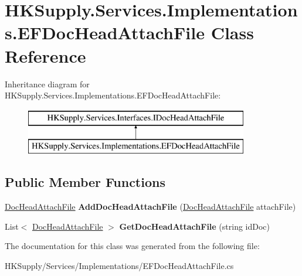 \hypertarget{class_h_k_supply_1_1_services_1_1_implementations_1_1_e_f_doc_head_attach_file}{}\section{H\+K\+Supply.\+Services.\+Implementations.\+E\+F\+Doc\+Head\+Attach\+File Class Reference}
\label{class_h_k_supply_1_1_services_1_1_implementations_1_1_e_f_doc_head_attach_file}
Inheritance diagram for H\+K\+Supply.\+Services.\+Implementations.\+E\+F\+Doc\+Head\+Attach\+File\+:\begin{figure}[H]
\begin{center}
\leavevmode
\includegraphics[height=2.000000cm]{class_h_k_supply_1_1_services_1_1_implementations_1_1_e_f_doc_head_attach_file}
\end{center}
\end{figure}
\subsection*{Public Member Functions}
\begin{DoxyCompactItemize}
\item 
\mbox{\label{class_h_k_supply_1_1_services_1_1_implementations_1_1_e_f_doc_head_attach_file_a6c6eab5d9a147b6475e36eb1ad2585d0}} 
\mbox{\hyperlink{class_h_k_supply_1_1_models_1_1_supply_1_1_doc_head_attach_file}{Doc\+Head\+Attach\+File}} {\bfseries Add\+Doc\+Head\+Attach\+File} (\mbox{\hyperlink{class_h_k_supply_1_1_models_1_1_supply_1_1_doc_head_attach_file}{Doc\+Head\+Attach\+File}} attach\+File)
\item 
\mbox{\label{class_h_k_supply_1_1_services_1_1_implementations_1_1_e_f_doc_head_attach_file_a7f150dcc2a280bf681c53b6cd0921561}} 
List$<$ \mbox{\hyperlink{class_h_k_supply_1_1_models_1_1_supply_1_1_doc_head_attach_file}{Doc\+Head\+Attach\+File}} $>$ {\bfseries Get\+Doc\+Head\+Attach\+File} (string id\+Doc)
\end{DoxyCompactItemize}


The documentation for this class was generated from the following file\+:\begin{DoxyCompactItemize}
\item 
H\+K\+Supply/\+Services/\+Implementations/E\+F\+Doc\+Head\+Attach\+File.\+cs\end{DoxyCompactItemize}
